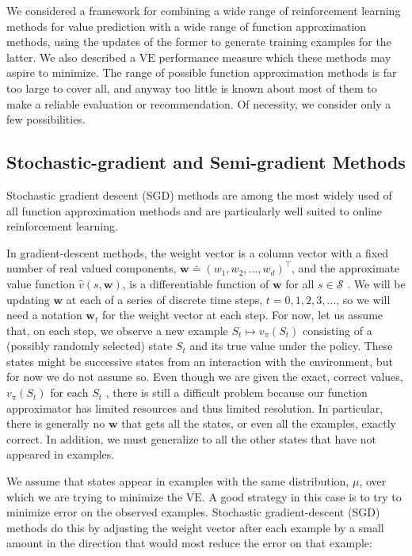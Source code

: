 \documentclass{article}
\begin{document}
We considered a framework for combining a wide range of reinforcement learning methods for value prediction with a wide range of function approximation methods, using the updates of the former to generate training examples for the latter. 
We also described a $\overline { { \mathrm { V E } } }$ performance measure which these methods may aspire to minimize. The range of possible function approximation methods is far too large to cover all, 
and anyway too little is known about most of them to make a reliable evaluation or recommendation. Of necessity, we consider only a few possibilities.

\subsection{Stochastic-gradient and Semi-gradient Methods}

Stochastic gradient descent (SGD) methods are among the most widely used of all function approximation methods and are particularly well suited to online reinforcement learning.

In gradient-descent methods, the weight vector is a column vector with a fixed number of real valued components, $\mathbf { w } \doteq ( w _ { 1 } , w _ { 2 } , \ldots , w _ { d } ) ^ { \top }$, and the approximate value function $\hat { v } ( s , \mathbf { w } )$, 
is a differentiable function of $\mathbf { w }$ for all $s \in \mathcal { S }$ . We will be updating $\mathbf { w }$ at each of a series of discrete time steps, $t = 0 , 1 , 2 , 3 , \ldots$, so we will need a notation $\mathbf { w } _ { t }$ for the weight vector at each step. For now, let us assume that, on each step, we observe a new example 
$S _ { t } \mapsto v _ { \pi } ( S _ { t } )$ consisting of a (possibly randomly selected) state $S _ { t }$ and its true value under the policy. These states might be successive states from an interaction with the environment, but for now we do not assume so. Even though we are given the exact, correct values, 
$v _ { \pi } ( S _ { t } )$ for each $S _ { t }$ , there is still a difficult problem because our function approximator has limited resources and thus limited resolution. In particular, there is generally no $\mathbf { w }$ that gets all the states, or even all the examples, exactly correct. In addition, we must generalize to 
all the other states that have not appeared in examples.

We assume that states appear in examples with the same distribution, $\mu$, over which we are trying to minimize the $\overline { { \mathrm { V E } } }$. A good strategy in this case is to try to minimize error on the observed examples. Stochastic gradient-descent (SGD) methods do this by adjusting 
the weight vector after each example by a small amount in the direction that would most reduce the error on that example:
\end{document}
